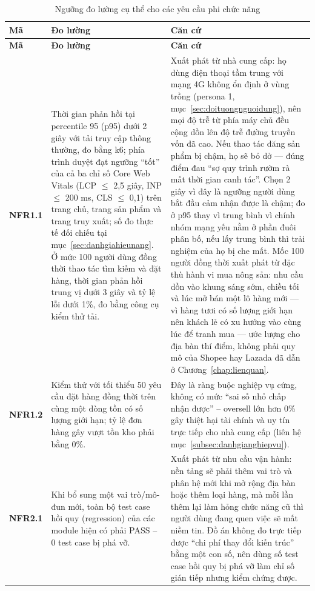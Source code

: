 \begingroup
\tblsetup\tblzebra
\begin{longtable}{L{1.67cm} L{6.67cm} L{6.56cm}}
\caption{Ngưỡng đo lường cụ thể cho các yêu cầu phi chức năng}
\label{tab:nguongNFR} \\
\toprule
{}
\textbf{Mã} & \textbf{Đo lường} & \textbf{Căn cứ} \\
\midrule
\endfirsthead
\toprule
{}
\textbf{Mã} & \textbf{Đo lường} & \textbf{Căn cứ} \\
\midrule
\endhead
\bottomrule
\endfoot
\textbf{NFR1.1} &
Thời gian phản hồi tại percentile 95 (p95) dưới 2 giây với tải truy cập thông thường, đo bằng k6; phía trình duyệt đạt ngưỡng ``tốt'' của cả ba chỉ số Core Web Vitals (LCP $\le$ 2,5 giây, INP $\le$ 200 ms, CLS $\le$ 0,1) trên trang chủ, trang sản phẩm và trang truy xuất; số đo thực tế đối chiếu tại mục~\ref{sec:danhgiahieunang}. Ở mức 100 người dùng đồng thời thao tác tìm kiếm và đặt hàng, thời gian phản hồi trung vị dưới 3 giây và tỷ lệ lỗi dưới 1\%, đo bằng công cụ kiểm thử tải. &
Xuất phát từ nhà cung cấp: họ dùng điện thoại tầm trung với mạng 4G không ổn định ở vùng trồng (persona 1, mục~\ref{sec:doituongnguoidung}), nên mọi độ trễ từ phía máy chủ đều cộng dồn lên độ trễ đường truyền vốn đã cao. Nếu thao tác đăng sản phẩm bị chậm, họ sẽ bỏ dở --- đúng điểm đau ``sợ quy trình rườm rà mất thời gian canh tác''. Chọn 2 giây vì đây là ngưỡng người dùng bắt đầu cảm nhận được là chậm; đo ở p95 thay vì trung bình vì chính nhóm mạng yếu nằm ở phần đuôi phân bố, nếu lấy trung bình thì trải nghiệm của họ bị che mất. Mốc 100 người đồng thời xuất phát từ đặc thù hành vi mua nông sản: nhu cầu dồn vào khung sáng sớm, chiều tối và lúc mở bán một lô hàng mới --- vì hàng tươi có số lượng giới hạn nên khách lẻ có xu hướng vào cùng lúc để tranh mua --- ước lượng cho địa bàn thí điểm, không phải quy mô của Shopee hay Lazada đã dẫn ở Chương~\ref{chap:lienquan}. \\
\textbf{NFR1.2} &
Kiểm thử với tối thiểu 50 yêu cầu đặt hàng đồng thời trên cùng một dòng tồn có số lượng giới hạn; tỷ lệ đơn hàng gây vượt tồn kho phải bằng 0\%. &
Đây là ràng buộc nghiệp vụ cứng, không có mức ``sai số nhỏ chấp nhận được'' -- oversell lớn hơn 0\% gây thiệt hại tài chính và uy tín trực tiếp cho nhà cung cấp (liên hệ mục~\ref{subsec:danhgianghiepvu}). \\
\textbf{NFR2.1} &
Khi bổ sung một vai trò/mô-đun mới, toàn bộ test case hồi quy (regression) của các module hiện có phải PASS -- 0 test case bị phá vỡ. &
Xuất phát từ nhu cầu vận hành: nền tảng sẽ phải thêm vai trò và phân hệ mới khi mở rộng địa bàn hoặc thêm loại hàng, mà mỗi lần thêm lại làm hỏng chức năng cũ thì người dùng đang quen việc sẽ mất niềm tin. Đồ án không đo trực tiếp được ``chi phí thay đổi kiến trúc'' bằng một con số, nên dùng số test case hồi quy bị phá vỡ làm chỉ số gián tiếp nhưng kiểm chứng được. \\

\end{longtable}
